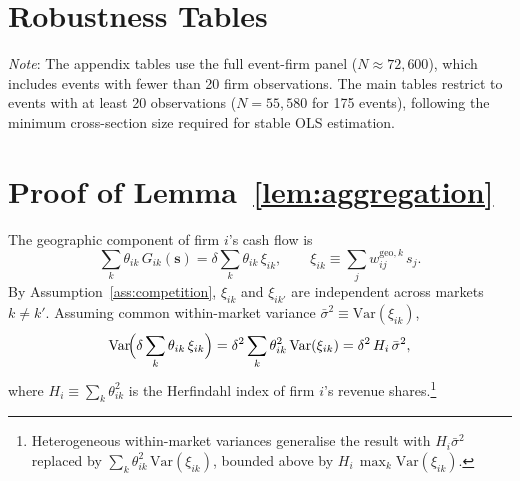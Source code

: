 \documentclass[12pt,a4paper]{article}
\begin{document}




\appendix
\section{Robustness Tables}\label{app:robustness}

\noindent\footnotesize\textit{Note}: The appendix tables use the full event-firm panel ($N \approx 72{,}600$), which includes events with fewer than 20 firm observations. The main tables restrict to events with at least 20 observations ($N = 55{,}580$ for 175 events), following the minimum cross-section size required for stable OLS estimation.\normalsize

\medskip











\section{Proof of Lemma~\ref{lem:aggregation}}\label{app:aggregation_proof}

The geographic component of firm $i$'s cash flow is
\[
\sum_k \theta_{ik}\, G_{ik}(\mathbf{s}) = \delta \sum_k \theta_{ik}\, \xi_{ik}, \qquad \xi_{ik} \equiv \sum_j w^{\mathrm{geo},k}_{ij}\, s_j.
\]
By Assumption~\ref{ass:competition}, $\xi_{ik}$ and $\xi_{ik'}$ are independent across markets $k\neq k'$. Assuming common within-market variance $\bar{\sigma}^2 \equiv \mathrm{Var}(\xi_{ik})$,
\[
\mathrm{Var}\!\Bigl(\delta\sum_k \theta_{ik}\, \xi_{ik}\Bigr) = \delta^2 \sum_k \theta_{ik}^2\, \mathrm{Var}(\xi_{ik}) = \delta^2\, H_i\, \bar{\sigma}^2,
\]
where $H_i \equiv \sum_k \theta_{ik}^2$ is the Herfindahl index of firm $i$'s revenue shares.\footnote{Heterogeneous within-market variances generalise the result with $H_i\bar{\sigma}^2$ replaced by $\sum_k\theta_{ik}^2\,\mathrm{Var}(\xi_{ik})$, bounded above by $H_i\,\max_k\mathrm{Var}(\xi_{ik})$.}
\end{document}
